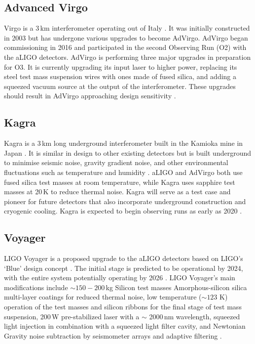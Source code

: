 \documentclass[letterpaper, aps, prd, twocolumn, superscriptaddress, showpacs, nofootinbib]{revtex4}
\begin{document}
\subsection{Advanced Virgo}

Virgo is a 3\,km interferometer operating out of Italy \cite{AdVirgo}. It was initially constructed in 2003 but has undergone various upgrades to become AdVirgo. AdVirgo began commissioning in 2016 and participated in the second Observing Run (O2) with the aLIGO detectors. AdVirgo is performing three major upgrades in preparation for O3. It is currently upgrading its input laser to higher power, replacing its steel test mass suspension wires with ones made of fused silica, and adding a squeezed vacuum source at the output of the interferometer. These upgrades should result in AdVirgo approaching design sensitivity \cite{AdVirgo, whitepaper2018}.

\subsection{Kagra}

Kagra is a 3\,km long underground interferometer built in the Kamioka mine in Japan \cite{2013PhRvD..88d3007A, akutsu2018kagra}. It is similar in design to other existing detectors but is built underground to minimise seismic noise, gravity gradient noise, and other environmental fluctuations such as temperature and humidity \cite{Somiya2012detector}. aLIGO and AdVirgo both use fused silica test masses at room temperature, while Kagra uses sapphire test masses at 20\,K to reduce thermal noise. Kagra will serve as a test case and pioneer for future detectors that also incorporate underground construction and cryogenic cooling. Kagra is expected to begin observing runs as early as 2020 \cite{2013PhRvD..88d3007A, Somiya2012detector, aso2013interferometer}.

\subsection{Voyager}

LIGO Voyager is a proposed upgrade to the aLIGO detectors based on LIGO's `Blue' design concept \cite{voyagerupgrade}. The initial stage is predicted to be operational by 2024, with the entire system potentially operating by 2026 \cite{whitepaper2018}. LIGO Voyager's main modifications include $\sim 150 - 200$\,kg Silicon test masses Amorphous-silicon silica multi-layer coatings for reduced thermal noise, low temperature ($\sim 123$ K) operation of the test masses and silicon ribbons for the final stage of test mass suspension, 200\,W pre-stabilized laser with a $\sim$ 2000\,nm wavelength, squeezed light injection in combination with a squeezed light filter cavity, and Newtonian Gravity noise subtraction by seismometer arrays and adaptive filtering \cite{2015PhRvD..91h2001D, whitepaper2018}.
\end{document}
